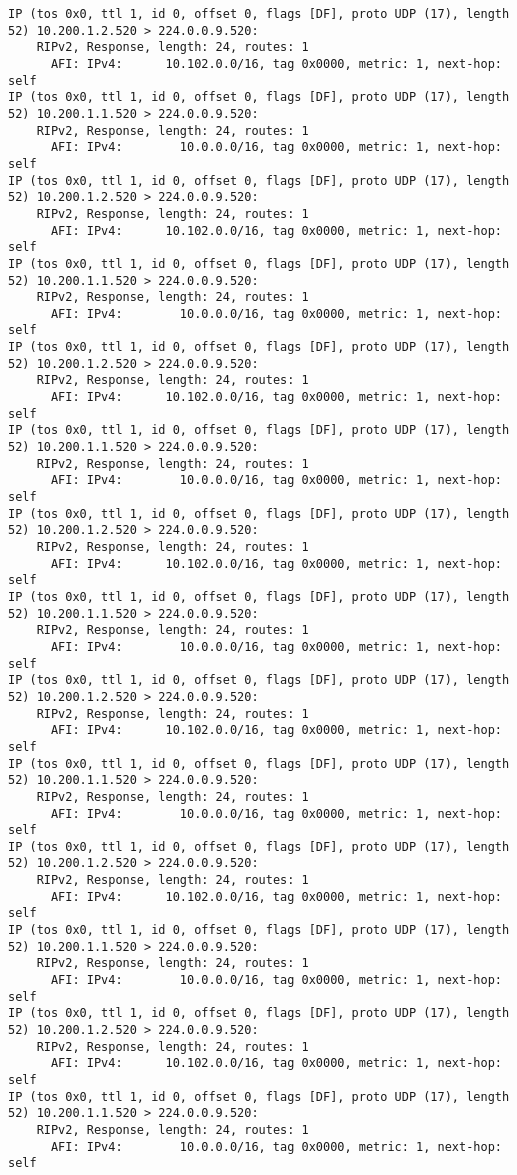 \documentclass[a4paper,12pt]{article}
\begin{document}
\begin{Verbatim}
IP (tos 0x0, ttl 1, id 0, offset 0, flags [DF], proto UDP (17), length 52) 10.200.1.2.520 > 224.0.0.9.520: 
	RIPv2, Response, length: 24, routes: 1
	  AFI: IPv4:      10.102.0.0/16, tag 0x0000, metric: 1, next-hop: self
IP (tos 0x0, ttl 1, id 0, offset 0, flags [DF], proto UDP (17), length 52) 10.200.1.1.520 > 224.0.0.9.520: 
	RIPv2, Response, length: 24, routes: 1
	  AFI: IPv4:        10.0.0.0/16, tag 0x0000, metric: 1, next-hop: self
IP (tos 0x0, ttl 1, id 0, offset 0, flags [DF], proto UDP (17), length 52) 10.200.1.2.520 > 224.0.0.9.520: 
	RIPv2, Response, length: 24, routes: 1
	  AFI: IPv4:      10.102.0.0/16, tag 0x0000, metric: 1, next-hop: self
IP (tos 0x0, ttl 1, id 0, offset 0, flags [DF], proto UDP (17), length 52) 10.200.1.1.520 > 224.0.0.9.520: 
	RIPv2, Response, length: 24, routes: 1
	  AFI: IPv4:        10.0.0.0/16, tag 0x0000, metric: 1, next-hop: self
IP (tos 0x0, ttl 1, id 0, offset 0, flags [DF], proto UDP (17), length 52) 10.200.1.2.520 > 224.0.0.9.520: 
	RIPv2, Response, length: 24, routes: 1
	  AFI: IPv4:      10.102.0.0/16, tag 0x0000, metric: 1, next-hop: self
IP (tos 0x0, ttl 1, id 0, offset 0, flags [DF], proto UDP (17), length 52) 10.200.1.1.520 > 224.0.0.9.520: 
	RIPv2, Response, length: 24, routes: 1
	  AFI: IPv4:        10.0.0.0/16, tag 0x0000, metric: 1, next-hop: self
IP (tos 0x0, ttl 1, id 0, offset 0, flags [DF], proto UDP (17), length 52) 10.200.1.2.520 > 224.0.0.9.520: 
	RIPv2, Response, length: 24, routes: 1
	  AFI: IPv4:      10.102.0.0/16, tag 0x0000, metric: 1, next-hop: self
IP (tos 0x0, ttl 1, id 0, offset 0, flags [DF], proto UDP (17), length 52) 10.200.1.1.520 > 224.0.0.9.520: 
	RIPv2, Response, length: 24, routes: 1
	  AFI: IPv4:        10.0.0.0/16, tag 0x0000, metric: 1, next-hop: self
IP (tos 0x0, ttl 1, id 0, offset 0, flags [DF], proto UDP (17), length 52) 10.200.1.2.520 > 224.0.0.9.520: 
	RIPv2, Response, length: 24, routes: 1
	  AFI: IPv4:      10.102.0.0/16, tag 0x0000, metric: 1, next-hop: self
IP (tos 0x0, ttl 1, id 0, offset 0, flags [DF], proto UDP (17), length 52) 10.200.1.1.520 > 224.0.0.9.520: 
	RIPv2, Response, length: 24, routes: 1
	  AFI: IPv4:        10.0.0.0/16, tag 0x0000, metric: 1, next-hop: self
IP (tos 0x0, ttl 1, id 0, offset 0, flags [DF], proto UDP (17), length 52) 10.200.1.2.520 > 224.0.0.9.520: 
	RIPv2, Response, length: 24, routes: 1
	  AFI: IPv4:      10.102.0.0/16, tag 0x0000, metric: 1, next-hop: self
IP (tos 0x0, ttl 1, id 0, offset 0, flags [DF], proto UDP (17), length 52) 10.200.1.1.520 > 224.0.0.9.520: 
	RIPv2, Response, length: 24, routes: 1
	  AFI: IPv4:        10.0.0.0/16, tag 0x0000, metric: 1, next-hop: self
IP (tos 0x0, ttl 1, id 0, offset 0, flags [DF], proto UDP (17), length 52) 10.200.1.2.520 > 224.0.0.9.520: 
	RIPv2, Response, length: 24, routes: 1
	  AFI: IPv4:      10.102.0.0/16, tag 0x0000, metric: 1, next-hop: self
IP (tos 0x0, ttl 1, id 0, offset 0, flags [DF], proto UDP (17), length 52) 10.200.1.1.520 > 224.0.0.9.520: 
	RIPv2, Response, length: 24, routes: 1
	  AFI: IPv4:        10.0.0.0/16, tag 0x0000, metric: 1, next-hop: self
\end{Verbatim}
\end{document}
